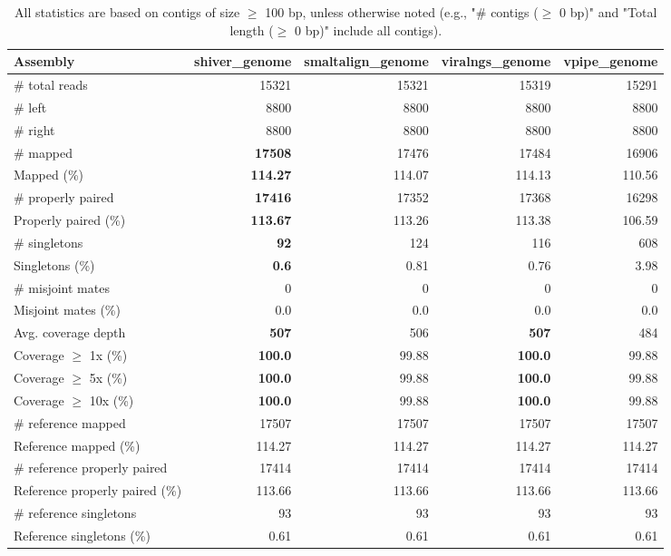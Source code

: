 \documentclass[12pt,a4paper]{article}
\begin{document}
\begin{table}[ht]
\begin{center}
\caption{All statistics are based on contigs of size $\geq$ 100 bp, unless otherwise noted (e.g., "\# contigs ($\geq$ 0 bp)" and "Total length ($\geq$ 0 bp)" include all contigs).}
\begin{tabular}{|l*{4}{|r}|}
\hline
Assembly & shiver\_genome & smaltalign\_genome & viralngs\_genome & vpipe\_genome \\ \hline
\# total reads & 15321 & 15321 & 15319 & 15291 \\ \hline
\# left & 8800 & 8800 & 8800 & 8800 \\ \hline
\# right & 8800 & 8800 & 8800 & 8800 \\ \hline
\# mapped & {\bf 17508} & 17476 & 17484 & 16906 \\ \hline
Mapped (\%) & {\bf 114.27} & 114.07 & 114.13 & 110.56 \\ \hline
\# properly paired & {\bf 17416} & 17352 & 17368 & 16298 \\ \hline
Properly paired (\%) & {\bf 113.67} & 113.26 & 113.38 & 106.59 \\ \hline
\# singletons & {\bf 92} & 124 & 116 & 608 \\ \hline
Singletons (\%) & {\bf 0.6} & 0.81 & 0.76 & 3.98 \\ \hline
\# misjoint mates & 0 & 0 & 0 & 0 \\ \hline
Misjoint mates (\%) & 0.0 & 0.0 & 0.0 & 0.0 \\ \hline
Avg. coverage depth & {\bf 507} & 506 & {\bf 507} & 484 \\ \hline
Coverage $\geq$ 1x (\%) & {\bf 100.0} & 99.88 & {\bf 100.0} & 99.88 \\ \hline
Coverage $\geq$ 5x (\%) & {\bf 100.0} & 99.88 & {\bf 100.0} & 99.88 \\ \hline
Coverage $\geq$ 10x (\%) & {\bf 100.0} & 99.88 & {\bf 100.0} & 99.88 \\ \hline
\# reference mapped & 17507 & 17507 & 17507 & 17507 \\ \hline
Reference mapped (\%) & 114.27 & 114.27 & 114.27 & 114.27 \\ \hline
\# reference properly paired & 17414 & 17414 & 17414 & 17414 \\ \hline
Reference properly paired (\%) & 113.66 & 113.66 & 113.66 & 113.66 \\ \hline
\# reference singletons & 93 & 93 & 93 & 93 \\ \hline
Reference singletons (\%) & 0.61 & 0.61 & 0.61 & 0.61 \\ \hline

\end{tabular}
\end{center}
\end{table}
\end{document}
